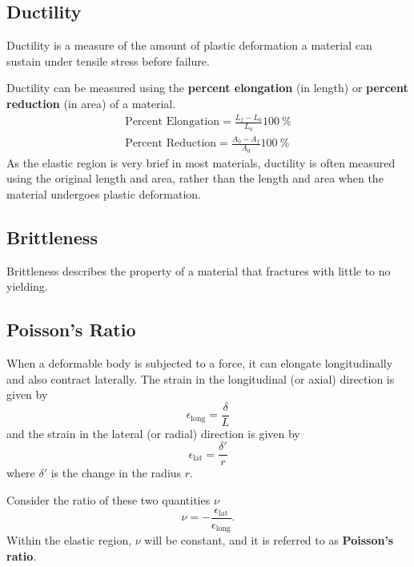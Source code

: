 \documentclass{article}
\begin{document}
\subsection{Ductility}
\begin{definition}[Ductility]
    Ductility is a measure of the amount of plastic deformation a material can sustain under tensile stress before failure.

    Ductility can be measured using the \textbf{percent elongation} (in length) or \textbf{percent reduction} (in area)
    of a material.
    \begin{align*}
        \textrm{Percent Elongation} = \frac{L_f - L_0}{L_0} \qty{100}{\%} \\
        \textrm{Percent Reduction} = \frac{A_0 - A_f}{A_0} \qty{100}{\%}
    \end{align*}
    As the elastic region is very brief in most materials, ductility is often measured using the
    original length and area, rather than the length and area when the material undergoes
    plastic deformation.
\end{definition}
\subsection{Brittleness}
\begin{definition}[Brittleness]
    Brittleness describes the property of a material that fractures with little to no yielding.
\end{definition}
\subsection{Poisson's Ratio}
When a deformable body is subjected to a force, it can elongate longitudinally and also contract laterally.
The strain in the longitudinal (or axial) direction is given by
\begin{equation*}
    \epsilon_{\mathrm{long}} = \frac{\delta}{L}
\end{equation*}
and the strain in the lateral (or radial) direction is given by
\begin{equation*}
    \epsilon_{\mathrm{lat}} = \frac{\delta'}{r}
\end{equation*}
where \(\delta'\) is the change in the radius \(r\).

Consider the ratio of these two quantities \(\nu\)
\begin{equation*}
    \nu = -\frac{\epsilon_{\mathrm{lat}}}{\epsilon_{\mathrm{long}}}.
\end{equation*}
Within the elastic region, \(\nu\) will be constant, and it is referred
to as \textbf{Poisson's ratio}.
\end{document}
